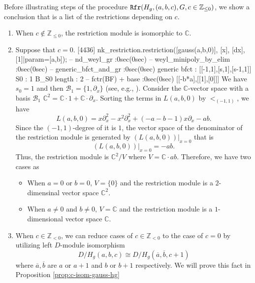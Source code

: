 \documentclass{article}
\def\p{\partial}
\def\aalpha{a}
\def\bbeta{b}
\def\ggamma{c}
\def\Hg{H_g}
\begin{document}
Before illustrating steps of the procedure 
$\mbox{\tt Rfr}(\Hg,(\aalpha,\bbeta,\ggamma),G,\ggamma \in \mathbb{Z}_{\leq 0})$,
we show a conclusion that is a list of the restrictions depending on $\ggamma$. 
\begin{enumerate}
\item[(1)]
When $\ggamma \notin \mathbb{Z}_{\leq 0}$,
the restriction module is isomorphic to $\mathbb{C}$.

\item[(2)]
Suppose that $\ggamma = 0$. 
[4436] nk_restriction.restriction([gauss(a,b,0)], [x], [dx], [1]|param=[a,b]);
-- nd_weyl_gr :0sec(0sec)
-- weyl_minipoly_by_elim :0sec(0sec)
-- generic_bfct_and_gr :0sec(0sec)
generic bfct : [[-1,1],[s,1],[s-1,1]]
S0 : 1
B_{S0} length : 2
-- fctr(BF) + base :0sec(0sec)
[[-b*a],[[1],[0]]]
\fi
We have $s_0 = 1$ and then $\mathcal{B}_1 = \{1, \p_x\}$ 
(see, e.g., \cite[Alg. 5.2.8]{SST}).
Consider the $\mathbb{C}$-vector space with a basis $\mathcal{B}_1$
$\mathbb{C}^2 = \mathbb{C} \cdot 1 + \mathbb{C} \cdot \p_x$.
Sorting the terms in $L(\aalpha, \bbeta, 0)$ by $<_{(-1,1)}$,
we have
$$
L(\aalpha, \bbeta, 0) = 
x \p_x^2 - x^2 \p_x^2 + (-\aalpha - \bbeta - 1 ) x \p_x - \aalpha \bbeta.
$$
Since the $(-1,1)$-degree of it is $1$, the vector space 
of the denominator of the restriction module is generated by
$(L(\aalpha, \bbeta, 0))|_{x=0}$ 
that is
$$
(L(\aalpha, \bbeta, 0))|_{x=0} = -\aalpha \bbeta .
$$
Thus, the restriction module is 
$\mathbb{C}^2/V$ where 
$
V = \mathbb{C} \cdot \aalpha \bbeta 
$.
Therefore, we have two cases as
  \begin{itemize}
   \item
   When $\aalpha = 0$ or $\bbeta = 0$, $V=\{0\}$ and the restriction module is 
a $2$-dimensinal vector space $\mathbb{C}^2$.
   \item
   When $\aalpha \neq 0$ and $\bbeta \neq 0$, $V=\mathbb{C}$  and the restriction module is a $1$-dimensional vector space $\mathbb{C}$.
   \end{itemize}
%
\item[(3)]
When $\ggamma \in \mathbb{Z}_{< 0}$,
we can reduce cases of 
$\ggamma \in \mathbb{Z}_{< 0}$ to the case of $\ggamma = 0$
by utilizing left $D$-module isomorphism
$$
D/\Hg(\aalpha, \bbeta, \ggamma) \cong D/\Hg(\overline{\aalpha}, \overline{\bbeta}, \ggamma+1)
$$ 
where 
$\overline{\aalpha}, \overline{\bbeta}$ are 
$\aalpha$ or $\aalpha+1$ and $\bbeta$ or $\bbeta+1$ respectively.
We will prove this fact in Proposition \ref{prop:c-isom-gauss-hg}
\end{enumerate}
\end{document}
